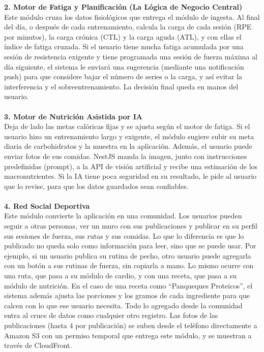 \textbf{2. Motor de Fatiga y Planificación (La Lógica de Negocio Central)}\\
Este módulo cruza los datos fisiológicos que entrega el módulo de ingesta. Al final del día, o después de cada entrenamiento, calcula la carga de cada sesión (RPE por minutos), la carga crónica (CTL) y la carga aguda (ATL), y con ellas el índice de fatiga cruzada. Si el usuario tiene mucha fatiga acumulada por una sesión de resistencia exigente y tiene programada una sesión de fuerza máxima al día siguiente, el sistema le enviará una sugerencia (mediante una notificación push) para que considere bajar el número de series o la carga, y así evitar la interferencia y el sobreentrenamiento. La decisión final queda en manos del usuario.
\\\\
\textbf{3. Motor de Nutrición Asistida por IA}\\
Deja de lado las metas calóricas fijas y se ajusta según el motor de fatiga. Si el usuario hizo un entrenamiento largo y exigente, el módulo sugiere subir su meta diaria de carbohidratos y la muestra en la aplicación. Además, el usuario puede enviar fotos de sus comidas. NestJS manda la imagen, junto con instrucciones predefinidas (prompt), a la API de visión artificial y recibe una estimación de los macronutrientes. Si la IA tiene poca seguridad en su resultado, le pide al usuario que lo revise, para que los datos guardados sean confiables.
\\\\
\textbf{4. Red Social Deportiva}\\
Este módulo convierte la aplicación en una comunidad. Los usuarios pueden seguir a otras personas, ver un muro con sus publicaciones y publicar en su perfil sus sesiones de fuerza, sus rutas y sus comidas. Lo que lo diferencia es que lo publicado no queda solo como información para leer, sino que se puede usar. Por ejemplo, si un usuario publica su rutina de pecho, otro usuario puede agregarla con un botón a sus rutinas de fuerza, sin copiarla a mano. Lo mismo ocurre con una ruta, que pasa a su módulo de cardio, y con una receta, que pasa a su módulo de nutrición. En el caso de una receta como ``Panqueques Proteicos'', el sistema además ajusta las porciones y los gramos de cada ingrediente para que calcen con lo que ese usuario necesita. Todo lo agregado desde la comunidad entra al cruce de datos como cualquier otro registro. Las fotos de las publicaciones (hasta 4 por publicación) se suben desde el teléfono directamente a Amazon S3 con un permiso temporal que entrega este módulo, y se muestran a través de CloudFront.
